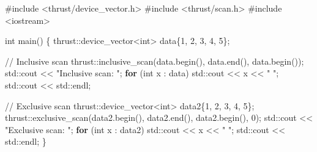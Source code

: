 \documentclass[
  letterpaper,
  DIV=11,
  numbers=noendperiod]{scrreprt}
\newenvironment{Shaded}{\begin{snugshade}}{\end{snugshade}}
\newcommand{\BuiltInTok}[1]{\textcolor[rgb]{0.00,0.23,0.31}{#1}}
\newcommand{\CommentTok}[1]{\textcolor[rgb]{0.37,0.37,0.37}{#1}}
\newcommand{\ControlFlowTok}[1]{\textcolor[rgb]{0.00,0.23,0.31}{\textbf{#1}}}
\newcommand{\DataTypeTok}[1]{\textcolor[rgb]{0.68,0.00,0.00}{#1}}
\newcommand{\DecValTok}[1]{\textcolor[rgb]{0.68,0.00,0.00}{#1}}
\newcommand{\ImportTok}[1]{\textcolor[rgb]{0.00,0.46,0.62}{#1}}
\newcommand{\NormalTok}[1]{\textcolor[rgb]{0.00,0.23,0.31}{#1}}
\newcommand{\OperatorTok}[1]{\textcolor[rgb]{0.37,0.37,0.37}{#1}}
\newcommand{\PreprocessorTok}[1]{\textcolor[rgb]{0.68,0.00,0.00}{#1}}
\newcommand{\StringTok}[1]{\textcolor[rgb]{0.13,0.47,0.30}{#1}}
\begin{document}
\begin{Shaded}
\begin{Highlighting}[]
\PreprocessorTok{\#include }\ImportTok{\textless{}thrust/device\_vector.h\textgreater{}}
\PreprocessorTok{\#include }\ImportTok{\textless{}thrust/scan.h\textgreater{}}
\PreprocessorTok{\#include }\ImportTok{\textless{}iostream\textgreater{}}

\DataTypeTok{int}\NormalTok{ main}\OperatorTok{()} \OperatorTok{\{}
\NormalTok{    thrust}\OperatorTok{::}\NormalTok{device\_vector}\OperatorTok{\textless{}}\DataTypeTok{int}\OperatorTok{\textgreater{}}\NormalTok{ data}\OperatorTok{\{}\DecValTok{1}\OperatorTok{,} \DecValTok{2}\OperatorTok{,} \DecValTok{3}\OperatorTok{,} \DecValTok{4}\OperatorTok{,} \DecValTok{5}\OperatorTok{\};}

    \CommentTok{// Inclusive scan}
\NormalTok{    thrust}\OperatorTok{::}\NormalTok{inclusive\_scan}\OperatorTok{(}\NormalTok{data}\OperatorTok{.}\NormalTok{begin}\OperatorTok{(),}\NormalTok{ data}\OperatorTok{.}\NormalTok{end}\OperatorTok{(),}\NormalTok{ data}\OperatorTok{.}\NormalTok{begin}\OperatorTok{());}
    \BuiltInTok{std::}\NormalTok{cout }\OperatorTok{\textless{}\textless{}} \StringTok{"Inclusive scan: "}\OperatorTok{;}
    \ControlFlowTok{for} \OperatorTok{(}\DataTypeTok{int}\NormalTok{ x }\OperatorTok{:}\NormalTok{ data}\OperatorTok{)} \BuiltInTok{std::}\NormalTok{cout }\OperatorTok{\textless{}\textless{}}\NormalTok{ x }\OperatorTok{\textless{}\textless{}} \StringTok{" "}\OperatorTok{;}
    \BuiltInTok{std::}\NormalTok{cout }\OperatorTok{\textless{}\textless{}} \BuiltInTok{std::}\NormalTok{endl}\OperatorTok{;}

    \CommentTok{// Exclusive scan}
\NormalTok{    thrust}\OperatorTok{::}\NormalTok{device\_vector}\OperatorTok{\textless{}}\DataTypeTok{int}\OperatorTok{\textgreater{}}\NormalTok{ data2}\OperatorTok{\{}\DecValTok{1}\OperatorTok{,} \DecValTok{2}\OperatorTok{,} \DecValTok{3}\OperatorTok{,} \DecValTok{4}\OperatorTok{,} \DecValTok{5}\OperatorTok{\};}
\NormalTok{    thrust}\OperatorTok{::}\NormalTok{exclusive\_scan}\OperatorTok{(}\NormalTok{data2}\OperatorTok{.}\NormalTok{begin}\OperatorTok{(),}\NormalTok{ data2}\OperatorTok{.}\NormalTok{end}\OperatorTok{(),}\NormalTok{ data2}\OperatorTok{.}\NormalTok{begin}\OperatorTok{(),} \DecValTok{0}\OperatorTok{);}
    \BuiltInTok{std::}\NormalTok{cout }\OperatorTok{\textless{}\textless{}} \StringTok{"Exclusive scan: "}\OperatorTok{;}
    \ControlFlowTok{for} \OperatorTok{(}\DataTypeTok{int}\NormalTok{ x }\OperatorTok{:}\NormalTok{ data2}\OperatorTok{)} \BuiltInTok{std::}\NormalTok{cout }\OperatorTok{\textless{}\textless{}}\NormalTok{ x }\OperatorTok{\textless{}\textless{}} \StringTok{" "}\OperatorTok{;}
    \BuiltInTok{std::}\NormalTok{cout }\OperatorTok{\textless{}\textless{}} \BuiltInTok{std::}\NormalTok{endl}\OperatorTok{;}
\OperatorTok{\}}
\end{Highlighting}
\end{Shaded}
\end{document}
